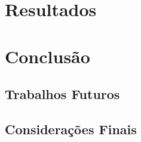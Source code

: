 \documentclass[
	12pt,               %
	openright,          %
	twoside,            %
	a4paper,            %
	english,            %
	brazil              %
	]{abntex2}
\begin{document}
\chapter{Resultados}

\chapter{Conclusão}

\section{Trabalhos Futuros}

\section{Considerações Finais}




\postextual



%
%






\end{document}
